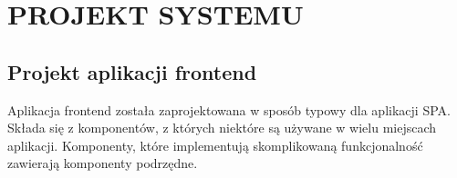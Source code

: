 \section{PROJEKT SYSTEMU}

\subsection{Projekt aplikacji frontend}

Aplikacja frontend została zaprojektowana w sposób typowy dla aplikacji SPA.
Składa się z komponentów, z których niektóre są używane w wielu miejscach
aplikacji. Komponenty, które implementują skomplikowaną funkcjonalność zawierają
komponenty podrzędne.

